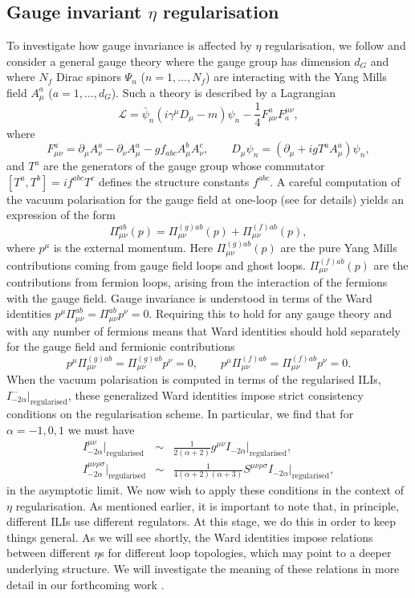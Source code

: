 \documentclass[12pt, letter]{article}
\def\be{\begin{equation}}
\def\ee{\end{equation}}
\begin{document}
\subsection{Gauge invariant $\eta$ regularisation}\label{VacuumPolarisation}
To investigate how gauge invariance is affected by $\eta$ regularisation, we follow \cite{Wu03, Wu04, Wu14} and consider a general gauge theory where the gauge group has dimension $d_G$ and where $N_f$ Dirac spinors $\Psi_n$ ($n=1, \ldots, N_f$) are interacting with the Yang Mills field $A^a_\mu$ ($a=1, \ldots, d_G$). Such a theory is described by a Lagrangian
\be
\mathcal{L}=\bar \psi_n (i\gamma^\mu D_\mu-m)\psi_n -\frac14 F_{\mu\nu}^a F^{\mu\nu}_a,
\ee
where
\be
F^a_{\mu\nu}=\partial_{\mu} A_\nu^a-\partial_{\nu} A_\mu^a - gf_{abc} A^b_\mu A^c_\nu, \qquad D_\mu \psi_n=(\partial_\mu +ig T^a A^a_\mu )\psi_n,
\ee
and  $T^a$ are the generators of the gauge group whose commutator $[T^a, T^b]=i f^{abc}T^c$ defines the structure constants $f^{abc}$. A careful computation of the vacuum polarisation  for the gauge field at one-loop (see \cite{Wu03, Wu04, Wu14} for details) yields an expression of the form 
\be
\Pi^{ab}_{\mu\nu}(p)=\Pi^{(g) ab}_{\mu\nu}(p)+\Pi^{(f) ab}_{\mu\nu}(p),
\ee
where $p^\mu$ is the external momentum. Here   $\Pi^{(g) ab}_{\mu\nu}(p)$ are the pure Yang Mills contributions coming from  gauge field loops and ghost loops.  $\Pi^{(f) ab}_{\mu\nu}(p)$ are the contributions from fermion loops, arising from the interaction of the fermions with the gauge field.  Gauge invariance is understood in terms of the Ward identities $p^\mu\Pi^{ab}_{\mu\nu}=\Pi^{ab}_{\mu\nu}p^\nu=0$.  Requiring this to hold for any gauge theory and with any number of fermions means that Ward identities should hold separately for the gauge field and fermionic contributions
\be \label{condition}
 p^\mu\Pi^{{(g)} ab}_{\mu\nu}=\Pi^{(g)ab}_{\mu\nu}p^\nu=0, \qquad  p^\mu\Pi^{{(f)} ab}_{\mu\nu}=\Pi^{(f)ab}_{\mu\nu}p^\nu=0.
\ee
When the vacuum polarisation is computed in terms of the regularised ILIs, $I^{\cdots}_{-2\alpha}|_\text{regularised}$, these generalized Ward identities  impose strict consistency conditions  on the regularisation scheme. In particular,  we find that for $\alpha=-1, 0, 1$ we must have  \cite{Wu03,Xing:2022jtt}
\begin{eqnarray}
I^{\mu\nu}_{-2\alpha}|_\text{regularised} &\sim&\frac{1}{2(\alpha+2)} g^{\mu\nu} I_{-2\alpha}|_\text{regularised}  \label{cond1}, \\
I^{\mu\nu\rho \sigma}_{-2\alpha}|_\text{regularised} &\sim &\frac{1}{4(\alpha+2)(\alpha+3)} S^{\mu\nu\rho\sigma} I_{-2\alpha}|_\text{regularised}, \label{cond2}
\end{eqnarray}
in the asymptotic limit. We now wish to apply these conditions in the context of $\eta$ regularisation. As mentioned earlier, it is important to note that, in principle, different ILIs use different regulators. At this stage, we do this in order to keep things general.  As we will see shortly,  the Ward identities impose relations between different $\eta$s for different loop topologies, which may point to a deeper underlying structure. We will investigate the meaning of these relations in more detail in our forthcoming work \cite{PadillaSmith23}.
\end{document}
